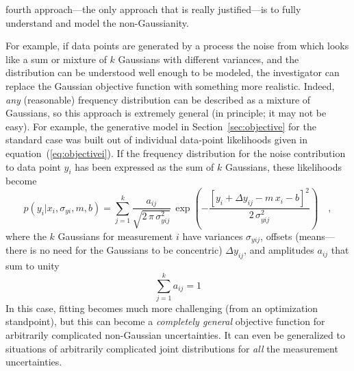 \documentclass[12pt,twoside]{article}
\newcommand{\sectionname}{Section}
\newcommand{\equationname}{equation}
\begin{document}
fourth approach---the only approach that is really justified---is to
fully understand and model the non-Gaussianity.

For example, if data points are generated by a process the noise from
which looks like a sum or mixture of $k$ Gaussians with different
variances, and the distribution can be understood well enough to be
modeled, the investigator can replace the Gaussian objective function
with something more realistic.  Indeed, \emph{any} (reasonable)
frequency distribution can be described as a mixture of Gaussians, so
this approach is extremely general (in principle; it may not be easy).
For example, the generative model in \sectionname~\ref{sec:objective}
for the standard case was built out of individual data-point
likelihoods given in \equationname~(\ref{eq:objectivei}).  If the
frequency distribution for the noise contribution to data point $y_i$
has been expressed as the sum of $k$ Gaussians, these likelihoods
become
\begin{equation}
p(y_i|x_i,\sigma_{yi},m,b) = \sum_{j=1}^k
 \frac{a_{ij}}{\sqrt{2\,\pi\,\sigma_{yij}^2}}
 \,\exp\left(-\frac{[y_i+\Delta y_{ij}-m\,x_i-b]^2}{2\,\sigma_{yij}^2}\right)
 \quad ,
\end{equation}
where the $k$ Gaussians for measurement $i$ have variances
$\sigma_{yij}$, offsets (means---there is no need for the Gaussians to
be concentric) $\Delta y_{ij}$, and amplitudes $a_{ij}$ that sum to
unity
\begin{equation}
\sum_{j=1}^k a_{ij} = 1
\end{equation}
In this case, fitting becomes much more challenging (from an
optimization standpoint), but this can become a \emph{completely
  general} objective function for arbitrarily complicated non-Gaussian
uncertainties.  It can even be generalized to situations of
arbitrarily complicated joint distributions for \emph{all} the
measurement uncertainties.
\end{document}
